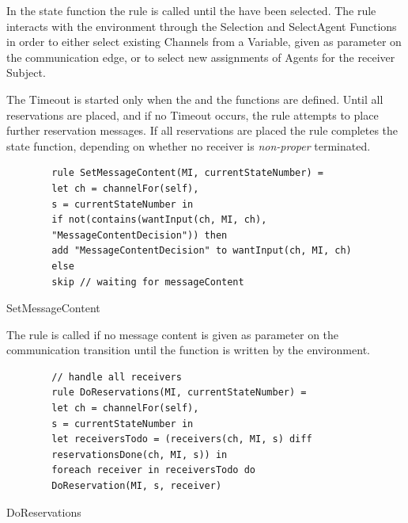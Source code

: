 In the state function the  rule is called until
the  have been selected. The  rule
interacts with the environment through the Selection and SelectAgent Functions
in order to either select existing Channels from a Variable, given as parameter
on the communication edge, or to select new assignments of Agents for the receiver
Subject.

The Timeout is started only when the  and the
 functions are defined. Until all reservations are
placed, and if no Timeout occurs, the  rule attempts
to place further reservation messages. If all reservations are placed the
 rule completes the state function, depending
on whether no receiver is \textit{non-proper} terminated.


\begin{listing}[H]
	\begin{verbatim}
		rule SetMessageContent(MI, currentStateNumber) =
		let ch = channelFor(self),
		s = currentStateNumber in
		if not(contains(wantInput(ch, MI, ch),
		"MessageContentDecision")) then
		add "MessageContentDecision" to wantInput(ch, MI, ch)
		else
		skip // waiting for messageContent
	\end{verbatim}
	\caption{SetMessageContent}
	\label{lst:shortasm:SetMessageContent}
\end{listing}



The  rule is called if no message content is
given as parameter on the communication transition until the 
function is written by the environment.





\begin{listing}[H]
	\begin{verbatim}
		// handle all receivers
		rule DoReservations(MI, currentStateNumber) =
		let ch = channelFor(self),
		s = currentStateNumber in
		let receiversTodo = (receivers(ch, MI, s) diff
		reservationsDone(ch, MI, s)) in
		foreach receiver in receiversTodo do
		DoReservation(MI, s, receiver)
	\end{verbatim}
	\caption{DoReservations}
	\label{lst:shortasm:DoReservations}
\end{listing}



